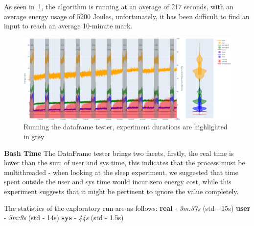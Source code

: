 As seen in~\ref{fig:dataframe_repeating}, the algorithm is running at an average of 217 seconds, with an average energy
usage of 5200 Joules, unfortunately, it has been difficult to find an input to reach an average 10-minute mark.

\begin{figure}[H]
    \centering
    \includegraphics[width=15cm]{figures/implementation/dataframe_repetition}
    \caption{Running the dataframe tester, experiment durations are highlighted in grey}
    \label{fig:dataframe_repeating}
\end{figure}

\textbf{Bash Time}
The DataFrame tester brings two facets, firstly, the real time is lower than the sum of user and sys time, this
indicates that the process must be multithreaded - when looking at the sleep experiment, we suggested that time spent
outside the user and sys time would incur zero energy cost, while this experiment suggests that it might be
pertinent to ignore the value completely.

The statistics of the exploratory run are as follows:
\textbf{real} - \textit{3m:37s} (std - 15s)
\textbf{user} - \textit{5m:9s} (std - 14s)
\textbf{sys} - \textit{44s} (std - 1.5s)

